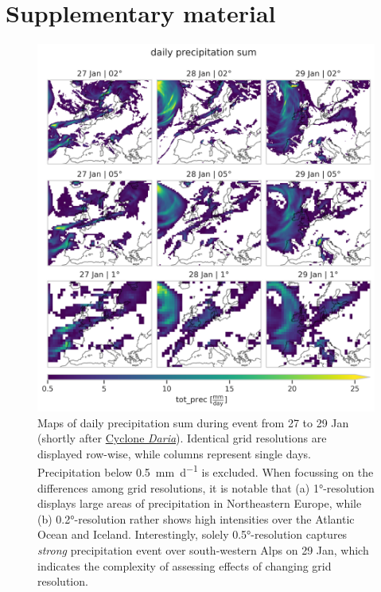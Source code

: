 \section{Supplementary material}\label{sec:app}

\begin{figure}[h]
	\centering
	\includegraphics[width=0.7\figwidth]{../figs/6-event.png}
	\caption{Maps of daily precipitation sum during event from 27 to 29 Jan (shortly after \href{https://en.wikipedia.org/wiki/Burns\%27_Day_Storm}{Cyclone \textit{Daria}}). Identical grid resolutions are displayed row-wise, while columns represent single days. Precipitation below \SI{0.5}{\mm\per\day} is excluded. When focussing on the differences among grid resolutions, it is notable that (a) 1°-resolution displays large areas of precipitation in Northeastern Europe, while (b) 0.2°-resolution rather shows high intensities over the Atlantic Ocean and Iceland. Interestingly, solely 0.5°-resolution captures \textit{strong} precipitation event over south-western Alps on 29 Jan, which indicates the complexity of assessing effects of changing grid resolution.}
	\label{fig:app-event}
\end{figure}